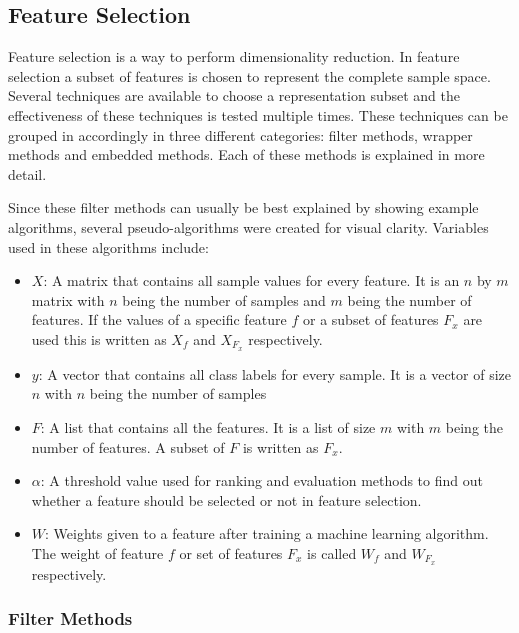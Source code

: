 \documentclass[10pt,a4paper]{article}
\begin{document}
	\subsection{Feature Selection}
	\label{subsec:FeatureSelection}
	
	Feature selection is a way to perform dimensionality reduction. In feature selection a subset of features is chosen to represent the complete sample space\cite{Guyon2006}. Several techniques are available to choose a representation subset and the effectiveness of these techniques is tested multiple times\cite{CATAL20091040, molina2002feature, chandrashekar2014survey}. These techniques can be grouped in accordingly in three different categories: filter methods, wrapper methods and embedded methods\cite{saeys2007review}. Each of these methods is explained in more detail.

	Since these filter methods can usually be best explained by showing example algorithms, several pseudo-algorithms were created for visual clarity. Variables used in these algorithms include:
	\begin{itemize}
		\item \textit{$X$}: A matrix that contains all sample values for every feature. It is an $n$ by $m$ matrix with $n$ being the number of samples and $m$ being the number of features. If the values of a specific feature $f$ or a subset of features $F_x$ are used this is written as $X_f$ and $X_{F_x}$ respectively.
		\item \textit{$y$}: A vector that contains all class labels for every sample. It is a vector of size $n$ with $n$ being the number of samples
		\item \textit{$F$}: A list that contains all the features. It is a list of size $m$ with $m$ being the number of features. A subset of $F$ is written as $F_x$.
		\item \textit{$\alpha$}: A threshold value used for ranking and evaluation methods to find out whether a feature should be selected or not in feature selection.
		\item \textit{$W$}: Weights given to a feature after training a machine learning algorithm. The weight of feature $f$ or set of features $F_x$ is called $W_f$ and $W_{F_x}$ respectively.
	\end{itemize}
	
	\subsubsection{Filter Methods}
	\label{subsec:FilterMethods}
	
\end{document}
